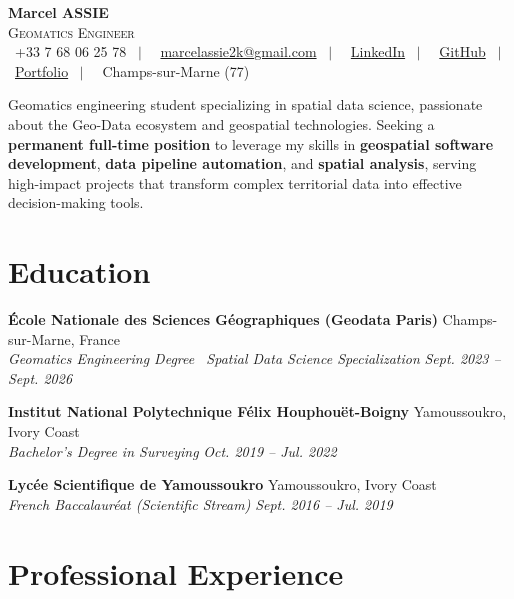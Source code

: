 \documentclass[11pt, a4paper]{article}
\newcommand{\cventry}[4]{
    \vspace{0.1cm}
    \noindent \textbf{#1} \hfill #2 \\
    \noindent \textit{#3} \hfill \textit{#4} \par
    \vspace{0.05cm}
}
\begin{document}
\pagestyle{empty}



\begin{center}
    {\Huge \textbf{Marcel ASSIE}} \\[0.2cm]
    {\Large \textsc{Geomatics Engineer}} \\[0.3cm]
    \footnotesize
    \faMobile~+33 7 68 06 25 78
    ~$|$~
    \faEnvelope~\href{mailto:marcelassie2k@gmail.com}{marcelassie2k@gmail.com}
    ~$|$~
    \faLinkedinSquare~\href{https://www.linkedin.com/in/marcel-assie/}{LinkedIn}
    ~$|$~
    \faGithub~\href{https://github.com/MarcelAssie/}{GitHub}
    ~$|$~
    \faGlobe~\href{https://marcel-assie.dev}{Portfolio}
    ~$|$~
    \faMapMarker~Champs-sur-Marne (77)
\end{center}

\vspace{0.3cm}
\noindent Geomatics engineering student specializing in spatial data science, passionate about the Geo-Data ecosystem and geospatial technologies. Seeking a \textbf{permanent full-time position} to leverage my skills in \textbf{geospatial software development}, \textbf{data pipeline automation}, and \textbf{spatial analysis}, serving high-impact projects that transform complex territorial data into effective decision-making tools.

\section*{Education}

\cventry{École Nationale des Sciences Géographiques (Geodata Paris)}{Champs-sur-Marne, France}{Geomatics Engineering Degree \textbullet\ Spatial Data Science Specialization}{Sept. 2023 -- Sept. 2026}
\cventry{Institut National Polytechnique Félix Houphouët-Boigny}{Yamoussoukro, Ivory Coast}{Bachelor's Degree in Surveying}{Oct. 2019 -- Jul. 2022}
\cventry{Lycée Scientifique de Yamoussoukro}{Yamoussoukro, Ivory Coast}{French Baccalauréat (Scientific Stream)}{Sept. 2016 -- Jul. 2019}

\section*{Professional Experience}
\end{document}
